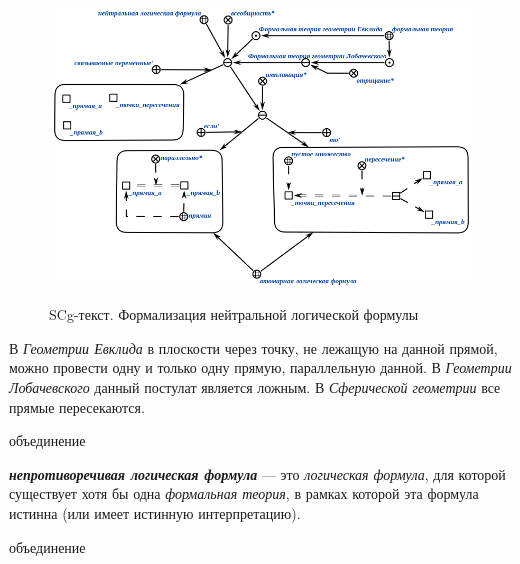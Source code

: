 \begin{figure}[H]
	\caption{SCg-текст. Формализация нейтральной логической формулы}
	\includegraphics[scale=0.8]{author/part2/figures/logic/neutral_formula.png}
	\label{fig:neutral_formula}
\end{figure}

В \textit{Геометрии Евклида} в плоскости через точку, не лежащую на данной прямой, можно провести одну и только одну прямую, параллельную данной. В \textit{Геометрии Лобачевского} данный постулат является ложным.
В \textit{Сферической геометрии} все прямые пересекаются.

\begin{SCn}
\begin{scnreltoset}{объединение}
\end{scnreltoset}
\end{SCn}

\textbf{\textit{непротиворечивая логическая формула}} --- это \textit{логическая формула}, для которой существует хотя бы одна \textit{формальная теория}, в рамках которой эта формула истинна (или имеет истинную интерпретацию).

\begin{SCn}
\begin{scnreltoset}{объединение}
\end{scnreltoset}
\end{SCn}


